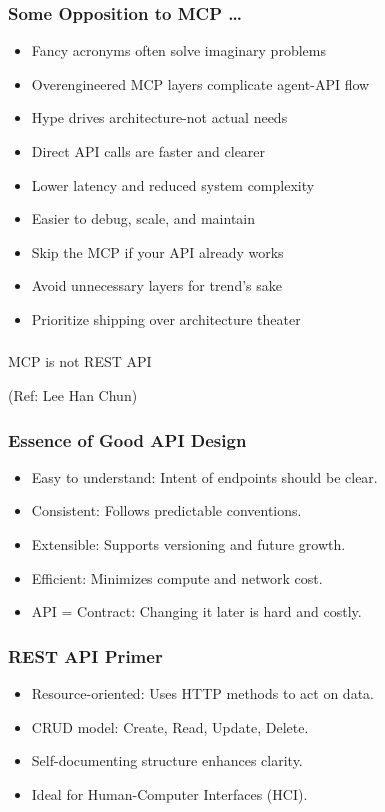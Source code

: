 \begin{frame}[fragile]\frametitle{Some Opposition to MCP \ldots}
    \begin{itemize}
        \item Fancy acronyms often solve imaginary problems
        \item Overengineered MCP layers complicate agent-API flow
        \item Hype drives architecture-not actual needs
        \item Direct API calls are faster and clearer
        \item Lower latency and reduced system complexity
        \item Easier to debug, scale, and maintain	
		\item Skip the MCP if your API already works
        \item Avoid unnecessary layers for trend's sake
        \item Prioritize shipping over architecture theater
    \end{itemize}
\end{frame}


\begin{frame}[fragile]\frametitle{}
\begin{center}
{\Large MCP is not REST API}

{\tiny (Ref: Lee Han Chun)}
\end{center}
\end{frame}

\begin{frame}[fragile]\frametitle{Essence of Good API Design}
\begin{itemize}
  \item Easy to understand: Intent of endpoints should be clear.
  \item Consistent: Follows predictable conventions.
  \item Extensible: Supports versioning and future growth.
  \item Efficient: Minimizes compute and network cost.
  \item API = Contract: Changing it later is hard and costly.
\end{itemize}
\end{frame}

\begin{frame}[fragile]\frametitle{REST API Primer}
\begin{itemize}
  \item Resource-oriented: Uses HTTP methods to act on data.
  \item CRUD model: Create, Read, Update, Delete.
  \item Self-documenting structure enhances clarity.
  \item Ideal for Human-Computer Interfaces (HCI).
\end{itemize}
\end{frame}

